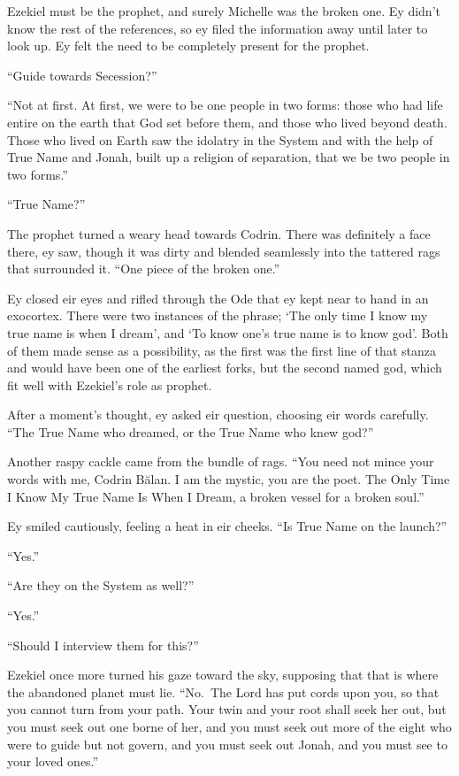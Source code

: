 Ezekiel must be the prophet, and surely Michelle was the broken one. Ey didn't know the rest of the references, so ey filed the information away until later to look up. Ey felt the need to be completely present for the prophet.

``Guide towards Secession?''

``Not at first. At first, we were to be one people in two forms: those who had life entire on the earth that God set before them, and those who lived beyond death. Those who lived on Earth saw the idolatry in the System and with the help of True Name and Jonah, built up a religion of separation, that we be two people in two forms.''

``True Name?''

The prophet turned a weary head towards Codrin. There was definitely a face there, ey saw, though it was dirty and blended seamlessly into the tattered rags that surrounded it. ``One piece of the broken one.''

Ey closed eir eyes and rifled through the Ode that ey kept near to hand in an exocortex. There were two instances of the phrase; `The only time I know my true name is when I dream', and `To know one's true name is to know god'. Both of them made sense as a possibility, as the first was the first line of that stanza and would have been one of the earliest forks, but the second named god, which fit well with Ezekiel's role as prophet.

After a moment's thought, ey asked eir question, choosing eir words carefully. ``The True Name who dreamed, or the True Name who knew god?''

Another raspy cackle came from the bundle of rags. ``You need not mince your words with me, Codrin Bălan. I am the mystic, you are the poet. The Only Time I Know My True Name Is When I Dream, a broken vessel for a broken soul.''

Ey smiled cautiously, feeling a heat in eir cheeks. ``Is True Name on the launch?''

``Yes.''

``Are they on the System as well?''

``Yes.''

``Should I interview them for this?''

Ezekiel once more turned his gaze toward the sky, supposing that that is where the abandoned planet must lie. ``No.~The Lord has put cords upon you, so that you cannot turn from your path. Your twin and your root shall seek her out, but you must seek out one borne of her, and you must seek out more of the eight who were to guide but not govern, and you must seek out Jonah, and you must see to your loved ones.''

